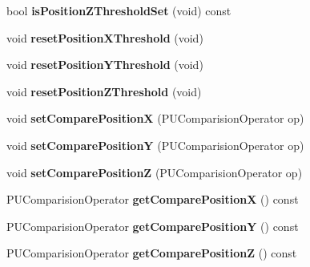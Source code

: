 \begin{DoxyCompactItemize}
\mbox{\label{classPUOnPositionObserver_a04f283891503b73303c5f1a3ab7ea8ec}} 
bool {\bfseries is\+Position\+Z\+Threshold\+Set} (void) const
\item 
\mbox{\label{classPUOnPositionObserver_ab984350151790dabdcd4a8d0fca6f6d7}} 
void {\bfseries reset\+Position\+X\+Threshold} (void)
\item 
\mbox{\label{classPUOnPositionObserver_a5deae2a5c7da5273837b10d835a91bfd}} 
void {\bfseries reset\+Position\+Y\+Threshold} (void)
\item 
\mbox{\label{classPUOnPositionObserver_a3f97c8dd4856dbb81016636ada6991bd}} 
void {\bfseries reset\+Position\+Z\+Threshold} (void)
\item 
\mbox{\label{classPUOnPositionObserver_a421dc33a59f7fdab827feae01a7f80a1}} 
void {\bfseries set\+Compare\+PositionX} (P\+U\+Comparision\+Operator op)
\item 
\mbox{\label{classPUOnPositionObserver_a78f6fb44ed4b2470b6295d24a781cdf9}} 
void {\bfseries set\+Compare\+PositionY} (P\+U\+Comparision\+Operator op)
\item 
\mbox{\label{classPUOnPositionObserver_a0a99e145c26eff473fc48d1b12213b36}} 
void {\bfseries set\+Compare\+PositionZ} (P\+U\+Comparision\+Operator op)
\item 
\mbox{\label{classPUOnPositionObserver_af5560297739859b8e4cf6ad24c0f4193}} 
P\+U\+Comparision\+Operator {\bfseries get\+Compare\+PositionX} () const
\item 
\mbox{\label{classPUOnPositionObserver_a4dc2371fe9eef55ae99ff4a70d0d15a6}} 
P\+U\+Comparision\+Operator {\bfseries get\+Compare\+PositionY} () const
\item 
\mbox{\label{classPUOnPositionObserver_aa8a7c3d2c56ca944879707d63117c3d9}} 
P\+U\+Comparision\+Operator {\bfseries get\+Compare\+PositionZ} () const
\item 

\end{DoxyCompactItemize}
